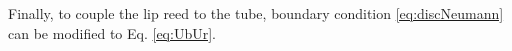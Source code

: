 Finally, to couple the lip reed to the tube, boundary condition \eqref{eq:discNeumann} can be modified to Eq. \eqref{eq:UbUr}. 

